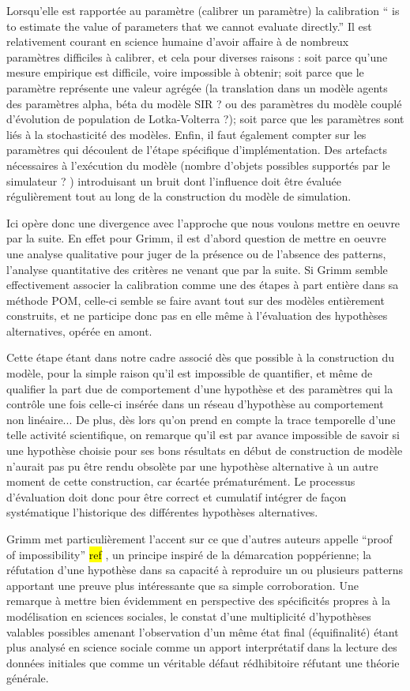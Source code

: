 Lorsqu'elle est rapportée au paramètre (calibrer un paramètre) la calibration \enquote{ is to estimate the value of parameters that we cannot evaluate directly.} Il est relativement courant en science humaine d'avoir affaire à de nombreux paramètres difficiles à calibrer, et cela pour diverses raisons : soit parce qu'une mesure empirique est difficile, voire impossible à obtenir; soit parce que le paramètre représente une valeur agrégée (la translation dans un modèle agents des paramètres alpha, béta du modèle SIR ? ou des paramètres du modèle couplé d'évolution de population de Lotka-Volterra ?); soit parce que les paramètres sont liés à la stochasticité des modèles. Enfin, il faut également compter sur les paramètres qui découlent de l'étape spécifique d'implémentation. Des artefacts nécessaires à l'exécution du modèle (nombre d'objets possibles supportés par le simulateur ? ) introduisant un bruit dont l'influence doit être évaluée régulièrement tout au long de la construction du modèle de simulation.

Ici opère donc une divergence avec l'approche que nous voulons mettre en oeuvre par la suite. En effet pour Grimm, il est d'abord question de mettre en oeuvre une analyse qualitative pour juger de la présence ou de l'absence des patterns, l'analyse quantitative des critères ne venant que par la suite. Si Grimm semble effectivement associer la calibration comme une des étapes à part entière dans sa méthode POM, celle-ci semble se faire avant tout sur des modèles entièrement construits, et ne participe donc pas en elle même à l'évaluation des hypothèses alternatives, opérée en amont. %

Cette étape étant dans notre cadre associé dès que possible à la construction du modèle, pour la simple raison qu'il est impossible de quantifier, et même de qualifier la part due de comportement d'une hypothèse et des paramètres qui la contrôle une fois celle-ci insérée dans un réseau d'hypothèse au comportement non linéaire... De plus, dès lors qu'on prend en compte la trace temporelle d'une telle activité scientifique, on remarque qu'il est par avance impossible de savoir si une hypothèse choisie pour ses bons résultats en début de construction de modèle n'aurait pas pu être rendu obsolète par une hypothèse alternative à un autre moment de cette construction, car écartée prématurément. Le processus d'évaluation doit donc pour être correct et cumulatif intégrer de façon systématique l'historique des différentes hypothèses alternatives.

Grimm met particulièrement l'accent sur ce que d'autres auteurs appelle \enquote{proof of impossibility} \hl{ref }, un principe inspiré de la démarcation poppérienne; la réfutation d'une hypothèse dans sa capacité à reproduire un ou plusieurs patterns apportant une preuve plus intéressante que sa simple corroboration. Une remarque à mettre bien évidemment en perspective des spécificités propres à la modélisation en sciences sociales, le constat d'une multiplicité d'hypothèses valables possibles amenant l'observation d'un même état final (équifinalité) étant plus analysé en science sociale comme un apport interprétatif dans la lecture des données initiales que comme un véritable défaut rédhibitoire réfutant une théorie générale. 

